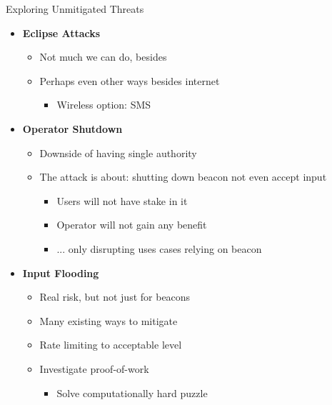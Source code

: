 \begin{frame}{Exploring Unmitigated Threats}
{\begin{multicols}{2}
\begin{itemize}
            \item \textbf{Eclipse Attacks}
            \begin{itemize}
                \item Not much we can do, besides
                \item Perhaps even other ways besides internet
                \begin{itemize}
                    \item Wireless option: SMS
                \end{itemize}
            \end{itemize}

            \item \textbf{Operator Shutdown}
            \begin{itemize}
                \item Downside of having single authority
                \item The attack is about: shutting down beacon \textrightarrow{} not even accept input
                \begin{itemize}
                    \item Users will not have stake in it
                    \item Operator will not gain any benefit
                    \item ... only disrupting uses cases relying on beacon
                \end{itemize}
            \end{itemize}

            \item \textbf{Input Flooding}
            \begin{itemize}
                \item Real risk, but not just for beacons
                \item Many existing ways to mitigate
                \item Rate limiting to acceptable level
                \item Investigate proof-of-work
                \begin{itemize}
                    \item Solve computationally hard puzzle
                \end{itemize}
            \end{itemize}
        \end{itemize}
    \end{multicols}
}\end{frame}


